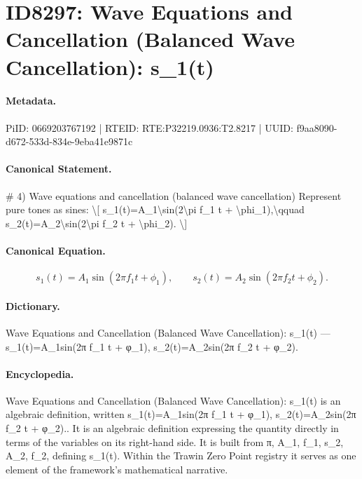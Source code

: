\section*{ID8297: Wave Equations and Cancellation (Balanced Wave Cancellation): s\_1(t)}
\paragraph{Metadata.}
PiID: 0669203767192 | RTEID: RTE:P32219.0936:T2.8217 | UUID: f9aa8090-d672-533d-834e-9eba41e9871c

\paragraph{Canonical Statement.}
\# 4) Wave equations and cancellation (balanced wave cancellation) Represent pure tones as sines: \textbackslash{}[ s\_1(t)=A\_1\textbackslash{}sin(2\textbackslash{}pi f\_1 t + \textbackslash{}phi\_1),\textbackslash{}qquad s\_2(t)=A\_2\textbackslash{}sin(2\textbackslash{}pi f\_2 t + \textbackslash{}phi\_2). \textbackslash{}]

\paragraph{Canonical Equation.}
\[
s_1(t)=A_1\sin(2\pi f_1 t + \phi_1),\qquad s_2(t)=A_2\sin(2\pi f_2 t + \phi_2).
\]

\paragraph{Dictionary.}
Wave Equations and Cancellation (Balanced Wave Cancellation): s\_1(t) — s\_1(t)=A\_1sin(2π f\_1 t + φ\_1), s\_2(t)=A\_2sin(2π f\_2 t + φ\_2).

\paragraph{Encyclopedia.}
Wave Equations and Cancellation (Balanced Wave Cancellation): s\_1(t) is an algebraic definition, written s\_1(t)=A\_1sin(2π f\_1 t + φ\_1), s\_2(t)=A\_2sin(2π f\_2 t + φ\_2).. It is an algebraic definition expressing the quantity directly in terms of the variables on its right-hand side. It is built from π, A\_1, f\_1, s\_2, A\_2, f\_2, defining s\_1(t). Within the Trawin Zero Point registry it serves as one element of the framework's mathematical narrative.
